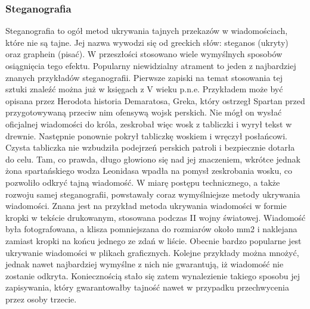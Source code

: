 \documentclass[a4paper]{article}
\begin{document}
\subsubsection{Steganografia}
Steganografia to ogół metod ukrywania tajnych przekazów w wiadomościach, które nie są tajne.
Jej nazwa wywodzi się od greckich słów: steganos (ukryty) oraz graphein (pisać). W przeszłości
stosowano wiele wymyślnych sposobów osiągnięcia tego efektu. Popularny niewidzialny atrament
to jeden z najbardziej znanych przykładów steganografii. Pierwsze zapiski na temat stosowania
tej sztuki znaleźć można już w księgach z V wieku p.n.e. Przykładem może być opisana przez
Herodota historia Demaratosa, Greka, który ostrzegł Spartan przed przygotowywaną przeciw nim
ofensywą wojsk perskich. Nie mógł on wysłać oficjalnej wiadomości do króla, zeskrobał więc wosk
z tabliczki i wyrył tekst w drewnie. Następnie ponownie pokrył tabliczkę woskiem i wręczył posłańcowi. Czysta tabliczka nie wzbudziła podejrzeń perskich patroli i bezpiecznie dotarła do celu.
Tam, co prawda, długo głowiono się nad jej znaczeniem, wkrótce jednak żona spartańskiego wodza
Leonidasa wpadła na pomysł zeskrobania wosku, co pozwoliło odkryć tajną wiadomość. W miarę
postępu technicznego, a także rozwoju samej steganografii, powstawały coraz wymyślniejsze metody ukrywania wiadomości. Znana jest na przykład metoda ukrywania wiadomości w formie kropki
w tekście drukowanym, stosowana podczas II wojny światowej. Wiadomość była fotografowana,
a klisza pomniejszana do rozmiarów około mm2
i naklejana zamiast kropki na końcu jednego ze
zdań w liście. Obecnie bardzo popularne jest ukrywanie wiadomości w plikach graficznych. Kolejne
przykłady można mnożyć, jednak nawet najbardziej wymyślne z nich nie gwarantują, iż wiadomość
nie zostanie odkryta. Koniecznością stało się zatem wynalezienie takiego sposobu jej zapisywania,
który gwarantowałby tajność nawet w przypadku przechwycenia przez osoby trzecie.
\end{document}
